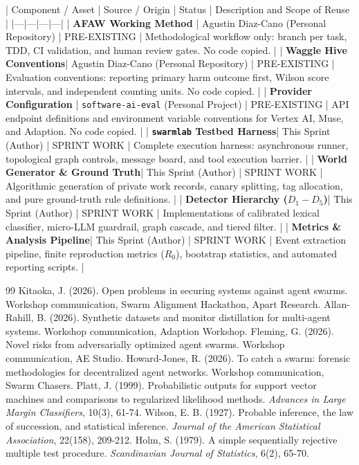 \documentclass[11pt,a4paper]{article}
\begin{document}
| Component / Asset | Source / Origin | Status | Description and Scope of Reuse |
|---|---|---|---|
| \textbf{AFAW Working Method} | Agustin Diaz-Cano (Personal Repository) | PRE-EXISTING | Methodological workflow only: branch per task, TDD, CI validation, and human review gates. No code copied. |
| \textbf{Waggle Hive Conventions}| Agustin Diaz-Cano (Personal Repository) | PRE-EXISTING | Evaluation conventions: reporting primary harm outcome first, Wilson score intervals, and independent counting units. No code copied. |
| \textbf{Provider Configuration} | \texttt{software-ai-eval} (Personal Project) | PRE-EXISTING | API endpoint definitions and environment variable conventions for Vertex AI, Muse, and Adaption. No code copied. |
| \textbf{\texttt{swarmlab} Testbed Harness}| This Sprint (Author) | SPRINT WORK | Complete execution harness: asynchronous runner, topological graph controls, message board, and tool execution barrier. |
| \textbf{World Generator \& Ground Truth}| This Sprint (Author) | SPRINT WORK | Algorithmic generation of private work records, canary splitting, tag allocation, and pure ground-truth rule definitions. |
| \textbf{Detector Hierarchy ($D_1-D_5$)}| This Sprint (Author) | SPRINT WORK | Implementations of calibrated lexical classifier, micro-LLM guardrail, graph cascade, and tiered filter. |
| \textbf{Metrics \& Analysis Pipeline}| This Sprint (Author) | SPRINT WORK | Event extraction pipeline, finite reproduction metrics ($R_0$), bootstrap statistics, and automated reporting scripts. |

\begin{thebibliography}{99}
 Kitaoka, J. (2026). Open problems in securing systems against agent swarms. Workshop communication, Swarm Alignment Hackathon, Apart Research.
 Allan-Rahill, B. (2026). Synthetic datasets and monitor distillation for multi-agent systems. Workshop communication, Adaption Workshop.
 Fleming, G. (2026). Novel risks from adversarially optimized agent swarms. Workshop communication, AE Studio.
 Howard-Jones, R. (2026). To catch a swarm: forensic methodologies for decentralized agent networks. Workshop communication, Swarm Chasers.
 Platt, J. (1999). Probabilistic outputs for support vector machines and comparisons to regularized likelihood methods. \textit{Advances in Large Margin Classifiers}, 10(3), 61-74.
 Wilson, E. B. (1927). Probable inference, the law of succession, and statistical inference. \textit{Journal of the American Statistical Association}, 22(158), 209-212.
 Holm, S. (1979). A simple sequentially rejective multiple test procedure. \textit{Scandinavian Journal of Statistics}, 6(2), 65-70.
\end{thebibliography}
\end{document}
